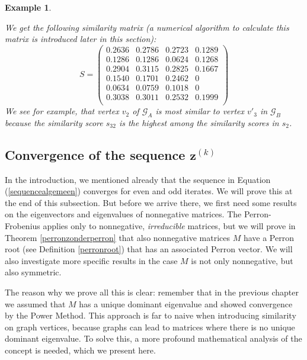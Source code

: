 \documentclass[a4paper,11pt]{report}
\newtheorem{example}[theorem]{Example}
\newcommand{\graf}{\mathscr{G}}
\begin{document}
\begin{example}
\begin{center}
\end{center}
We get the following similarity matrix (a numerical algorithm to calculate this matrix is introduced later
in this section):
$$S = \begin{pmatrix}
0.2636 & 0.2786 & 0.2723 & 0.1289 \\
0.1286 & 0.1286 & 0.0624 & 0.1268 \\
0.2904 & 0.3115 & 0.2825 & 0.1667 \\
0.1540 & 0.1701 & 0.2462 & 0 \\
0.0634 & 0.0759 & 0.1018 & 0 \\
0.3038 & 0.3011 & 0.2532 & 0.1999\\
 \end{pmatrix}$$
 We see for example, that vertex $v_2$ of $\graf_A$ is most similar to
 vertex $v'_3$ in $\graf_B$  because the similarity score $s_{32}$ 
 is the highest among the similarity scores in $s_{2}$.
 \end{example}
 
 \subsection{Convergence of the sequence $\mathbf{z}^{(k)}$}
In the introduction, we mentioned already that the sequence in Equation (\ref{sequencealgemeen})
converges for even and odd iterates. We will prove this at the end of this subsection. But before we 
arrive there, we first need some results on the eigenvectors and eigenvalues of nonnegative matrices. 
The Perron-Frobenius applies only to nonnegative, \emph{irreducible} matrices, 
but we will prove in Theorem \ref{perronzonderperron} that also nonnegative 
matrices $M$ have a Perron root (see Definition \ref{perronroot}) 
that has an associated Perron vector. We will also investigate more specific 
results in the case $M$ is not only nonnegative, but also symmetric. 

The reason why we prove all this is clear: remember that in the previous chapter 
we assumed that $M$ has a unique dominant eigenvalue and showed convergence by the Power Method. 
This approach is far to naive when introducing 
similarity on graph vertices, because graphs can lead to matrices where there is 
no unique dominant eigenvalue. To solve this, a more profound 
mathematical analysis of the concept is needed, which we present here.
\end{document}
